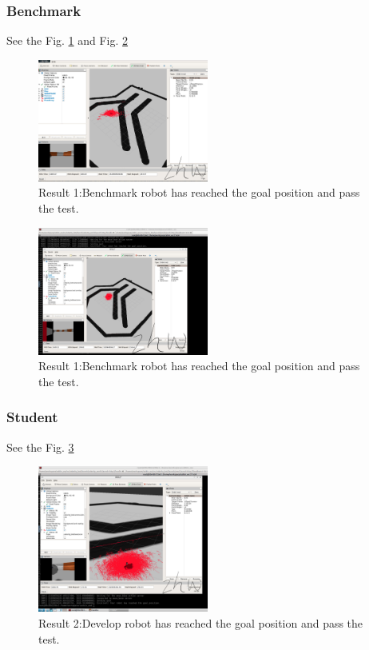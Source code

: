 \documentclass[10pt,journal,compsoc]{IEEEtran}
\begin{document}
\subsubsection{Benchmark}

See the Fig. \ref{fig:result11} and Fig. \ref{fig:result12}

\begin{figure}
\centering
\includegraphics[width=0.5\textwidth]{r3.png}
\caption{\label{fig:result11}Result 1:Benchmark robot has reached the goal position and pass the test.}
\end{figure}

\begin{figure}
\centering
\includegraphics[width=0.5\textwidth]{r0.png}
\caption{\label{fig:result12}Result 1:Benchmark robot has reached the goal position and pass the test.}
\end{figure}

\subsubsection{Student}
See the Fig. \ref{fig:result2} 

\begin{figure}
\centering
\includegraphics[width=0.5\textwidth]{r11.png}
\caption{\label{fig:result2}Result 2:Develop robot has reached the goal position and pass the test.}
\end{figure}
\end{document}
